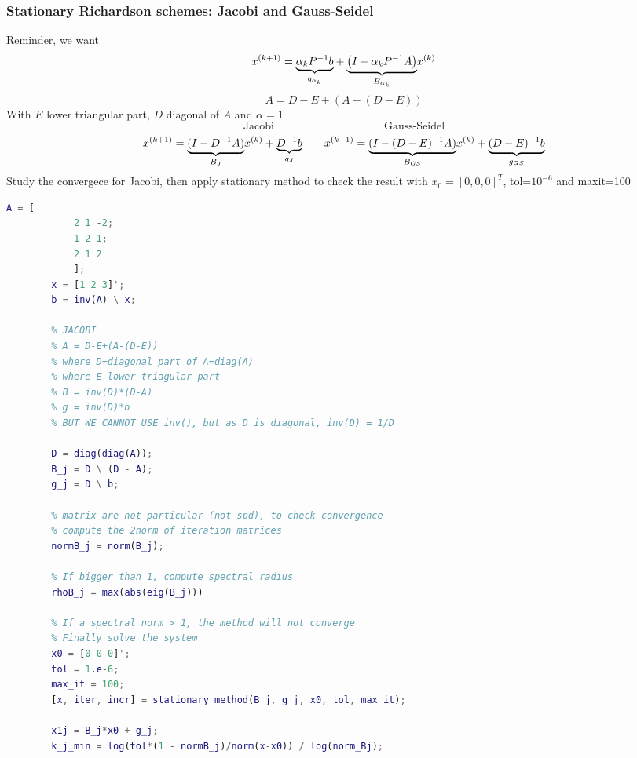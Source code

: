     \subsubsection{Stationary Richardson schemes: Jacobi and Gauss-Seidel}
        Reminder, we want
        $$
        x^{(k+1)}=
        \underlabel{\alpha_kP^{-1}b}{$g_{\alpha_k}$}+
        \underlabel{\left(
            I-\alpha_kP^{-1}A
            \right)}{$B_{\alpha_k}$}x^{(k)}
        $$
        $$
        A = D-E+(A-(D-E))
        $$
        With $E$ lower triangular part, $D$ diagonal of $A$ and $\alpha=1$
        $$
        \text{Jacobi}
        \qquad
        \qquad
        \qquad
        \qquad
        \qquad
        \text{Gauss-Seidel}
        $$
        $$
        x^{(k+1)}=\underlabel{(I-D^{-1}A)}{
            $B_J$
        }x^{(k)}+\underlabel{D^{-1}b}{
            $g_J$
        }
        \qquad
        x^{(k+1)}=\underlabel{(I-(D-E)^{-1}A)}{$B_{GS}$}x^{(k)}+
        \underlabel{(D-E)^{-1}b}{$g_{GS}$}
        $$
        Study the convergece for Jacobi, then apply stationary method to check the result with $x_0=[0,0,0]^T$, tol=$10^{-6}$ and maxit=100
        \begin{lstlisting}[language=Matlab, escapeinside=`', gobble=8]
        A = [
            2 1 -2;
            1 2 1;
            2 1 2
            ];
        x = [1 2 3]';
        b = inv(A) \ x;

        % JACOBI
        % A = D-E+(A-(D-E))
        % where D=diagonal part of A=diag(A)
        % where E lower triagular part
        % B = inv(D)*(D-A)
        % g = inv(D)*b
        % BUT WE CANNOT USE inv(), but as D is diagonal, inv(D) = 1/D

        D = diag(diag(A));
        B_j = D \ (D - A);
        g_j = D \ b;

        % matrix are not particular (not spd), to check convergence
        % compute the 2norm of iteration matrices
        normB_j = norm(B_j);

        % If bigger than 1, compute spectral radius
        rhoB_j = max(abs(eig(B_j)))

        % If a spectral norm > 1, the method will not converge
        % Finally solve the system
        x0 = [0 0 0]';
        tol = 1.e-6;
        max_it = 100;
        [x, iter, incr] = stationary_method(B_j, g_j, x0, tol, max_it);

        x1j = B_j*x0 + g_j;
        k_j_min = log(tol*(1 - normB_j)/norm(x-x0)) / log(norm_Bj);
        \end{lstlisting}

